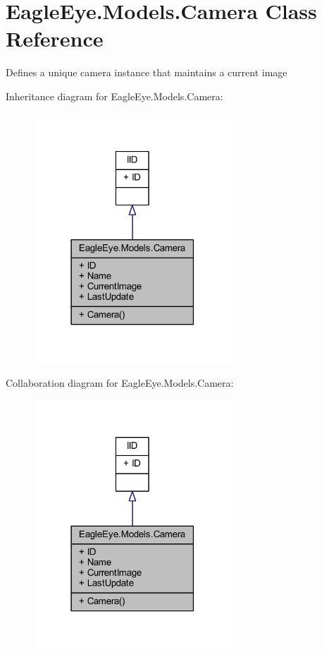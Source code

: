 \hypertarget{class_eagle_eye_1_1_models_1_1_camera}{}\section{Eagle\+Eye.\+Models.\+Camera Class Reference}
\label{class_eagle_eye_1_1_models_1_1_camera}


Defines a unique camera instance that maintains a current image  




Inheritance diagram for Eagle\+Eye.\+Models.\+Camera\+:
\nopagebreak
\begin{figure}[H]
\begin{center}
\leavevmode
\includegraphics[width=210pt]{class_eagle_eye_1_1_models_1_1_camera__inherit__graph}
\end{center}
\end{figure}


Collaboration diagram for Eagle\+Eye.\+Models.\+Camera\+:
\nopagebreak
\begin{figure}[H]
\begin{center}
\leavevmode
\includegraphics[width=210pt]{class_eagle_eye_1_1_models_1_1_camera__coll__graph}
\end{center}
\end{figure}
